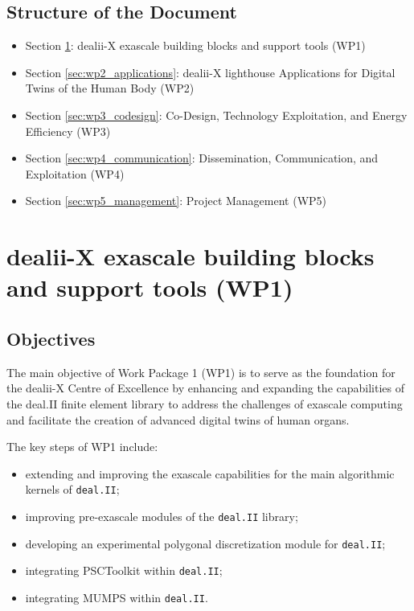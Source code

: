 \documentclass[a4paper,12pt, numbers]{article}
\newcommand{\dealii}{\texttt{deal.II}}
\begin{document}
	\subsection{{Structure of the Document}}
	\begin{itemize}
		\item Section \ref{sec:wp1_dealii}: dealii-X exascale building blocks and support tools (WP1)
		\item Section \ref{sec:wp2_applications}: dealii-X lighthouse Applications for Digital Twins of the Human Body (WP2)
		\item Section \ref{sec:wp3_codesign}: Co-Design, Technology Exploitation, and Energy Efficiency (WP3)
		\item Section \ref{sec:wp4_communication}: Dissemination, Communication, and Exploitation (WP4)
		\item Section \ref{sec:wp5_management}: Project Management (WP5)
	\end{itemize}
	
	\newpage
	
	\section{{dealii-X exascale building blocks and support tools (WP1)}}
	\label{sec:wp1_dealii}
	
	\subsection{Objectives}
	
	The main objective of Work Package 1 (WP1) is to serve as the foundation
	for the dealii-X Centre of Excellence by enhancing and expanding the
	capabilities of the deal.II finite element library to address the challenges of exascale
	computing and facilitate the creation of advanced digital twins of human
	organs.
	
	The key steps of WP1 include:
	\begin{itemize}
		\item extending and improving the exascale capabilities for the main
		algorithmic kernels of \dealii;
		\item improving pre-exascale modules of the \dealii{} library;
		\item developing an experimental polygonal discretization module for \dealii;
		\item integrating PSCToolkit within \dealii{};
		\item integrating MUMPS within \dealii{}.
	\end{itemize}
	
\end{document}
